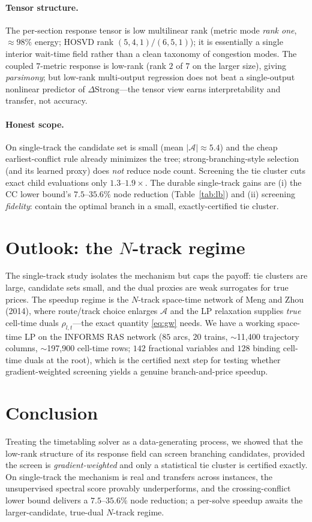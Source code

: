 \documentclass[11pt]{article}
\begin{document}
\paragraph{Tensor structure.} The per-section response tensor is low multilinear rank
(metric mode \emph{rank one}, $\approx 98\%$ energy; HOSVD rank $(5,4,1)/(6,5,1)$); it is
essentially a single interior wait-time field rather than a clean taxonomy of congestion
modes. The coupled $7$-metric response is low-rank (rank $2$ of $7$ on the larger size), giving
\emph{parsimony}; but low-rank multi-output regression does not beat a single-output nonlinear
predictor of $\Delta\mathrm{Strong}$---the tensor view earns interpretability and transfer, not
accuracy.

\paragraph{Honest scope.} On single-track the candidate set is small (mean $|\mathcal A|\approx
5.4$) and the cheap earliest-conflict rule already minimizes the tree; strong-branching-style
selection (and its learned proxy) does \emph{not} reduce node count. Screening the tie cluster
cuts exact child evaluations only $1.3$--$1.9\times$. The durable single-track gains are
(i) the CC lower bound's $7.5$--$35.6\%$ node reduction (Table~\ref{tab:lb}) and (ii) screening
\emph{fidelity}: contain the optimal branch in a small, exactly-certified tie cluster.

\section{Outlook: the $N$-track regime}
The single-track study isolates the mechanism but caps the payoff: tie clusters are large,
candidate sets small, and the dual proxies are weak surrogates for true prices. The speedup
regime is the $N$-track space-time network of Meng and Zhou (2014), where route/track choice
enlarges $\mathcal A$ and the LP relaxation supplies \emph{true} cell-time duals
$\rho_{l,t}$---the exact quantity \eqref{eq:gw} needs. We have a working space-time LP on the
INFORMS RAS network ($85$ arcs, $20$ trains, $\sim$11{,}400 trajectory columns, $\sim$197{,}900
cell-time rows; $142$ fractional variables and $128$ binding cell-time duals at the root),
which is the certified next step for testing whether gradient-weighted screening yields a
genuine branch-and-price speedup.

\section{Conclusion}
Treating the timetabling solver as a data-generating process, we showed that the low-rank
structure of its response field can screen branching candidates, provided the screen is
\emph{gradient-weighted} and only a statistical tie cluster is certified exactly. On
single-track the mechanism is real and transfers across instances, the unsupervised spectral
score provably underperforms, and the crossing-conflict lower bound delivers a $7.5$--$35.6\%$
node reduction; a per-solve speedup awaits the larger-candidate, true-dual $N$-track regime.
\end{document}
